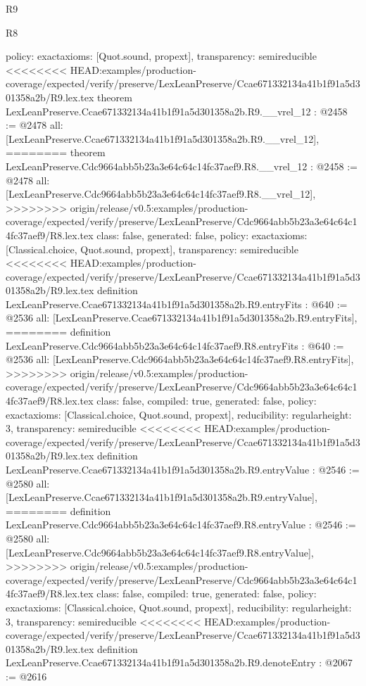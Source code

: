 \begin{lexlean}{R9}
\begin{lexlean}{R8}
\begin{coremodule}
{{{{{{{{{{{{{{{{{{{{{{{{{{{{{{{{{  policy: exact{axioms: [Quot.sound, propext]},
  transparency: semireducible
}
<<<<<<<< HEAD:examples/production-coverage/expected/verify/preserve/LexLeanPreserve/Ccae671332134a41b1f91a5d301358a2b/R9.lex.tex
theorem LexLeanPreserve.Ccae671332134a41b1f91a5d301358a2b.R9.__vrel_12 : @2458 := @2478 {
  all: [LexLeanPreserve.Ccae671332134a41b1f91a5d301358a2b.R9.__vrel_12],
========
theorem LexLeanPreserve.Cdc9664abb5b23a3e64c64c14fc37aef9.R8.__vrel_12 : @2458 := @2478 {
  all: [LexLeanPreserve.Cdc9664abb5b23a3e64c64c14fc37aef9.R8.__vrel_12],
>>>>>>>> origin/release/v0.5:examples/production-coverage/expected/verify/preserve/LexLeanPreserve/Cdc9664abb5b23a3e64c64c14fc37aef9/R8.lex.tex
  class: false,
  generated: false,
  policy: exact{axioms: [Classical.choice, Quot.sound, propext]},
  transparency: semireducible
}
<<<<<<<< HEAD:examples/production-coverage/expected/verify/preserve/LexLeanPreserve/Ccae671332134a41b1f91a5d301358a2b/R9.lex.tex
definition LexLeanPreserve.Ccae671332134a41b1f91a5d301358a2b.R9.entryFits : @640 := @2536 {
  all: [LexLeanPreserve.Ccae671332134a41b1f91a5d301358a2b.R9.entryFits],
========
definition LexLeanPreserve.Cdc9664abb5b23a3e64c64c14fc37aef9.R8.entryFits : @640 := @2536 {
  all: [LexLeanPreserve.Cdc9664abb5b23a3e64c64c14fc37aef9.R8.entryFits],
>>>>>>>> origin/release/v0.5:examples/production-coverage/expected/verify/preserve/LexLeanPreserve/Cdc9664abb5b23a3e64c64c14fc37aef9/R8.lex.tex
  class: false,
  compiled: true,
  generated: false,
  policy: exact{axioms: [Classical.choice, Quot.sound, propext]},
  reducibility: regular{height: 3},
  transparency: semireducible
}
<<<<<<<< HEAD:examples/production-coverage/expected/verify/preserve/LexLeanPreserve/Ccae671332134a41b1f91a5d301358a2b/R9.lex.tex
definition LexLeanPreserve.Ccae671332134a41b1f91a5d301358a2b.R9.entryValue : @2546 := @2580 {
  all: [LexLeanPreserve.Ccae671332134a41b1f91a5d301358a2b.R9.entryValue],
========
definition LexLeanPreserve.Cdc9664abb5b23a3e64c64c14fc37aef9.R8.entryValue : @2546 := @2580 {
  all: [LexLeanPreserve.Cdc9664abb5b23a3e64c64c14fc37aef9.R8.entryValue],
>>>>>>>> origin/release/v0.5:examples/production-coverage/expected/verify/preserve/LexLeanPreserve/Cdc9664abb5b23a3e64c64c14fc37aef9/R8.lex.tex
  class: false,
  compiled: true,
  generated: false,
  policy: exact{axioms: [Classical.choice, Quot.sound, propext]},
  reducibility: regular{height: 3},
  transparency: semireducible
}
<<<<<<<< HEAD:examples/production-coverage/expected/verify/preserve/LexLeanPreserve/Ccae671332134a41b1f91a5d301358a2b/R9.lex.tex
definition LexLeanPreserve.Ccae671332134a41b1f91a5d301358a2b.R9.denoteEntry : @2067 := @2616 {
}}}}}}}}}}}}}}}}}}}}}}}}}}}}}}}}}}}}
\end{coremodule}
\end{lexlean}
\end{lexlean}
